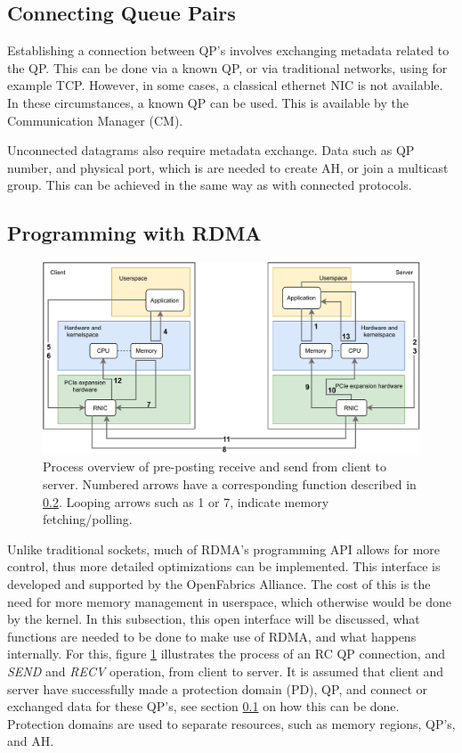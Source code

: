 \subsection{Connecting Queue Pairs}\label{subsec:connecting-qp's}
Establishing a connection between QP's involves exchanging metadata related to the QP.
This can be done via a known QP, or via traditional networks, using for example TCP.
However, in some cases, a classical ethernet NIC is not available.
In these circumstances, a known QP can be used.
This is available by the Communication Manager (CM)\cite{mellanox_prog_guide, rdmamojo}.

Unconnected datagrams also require metadata exchange.
Data such as QP number, and physical port, which is are needed to create AH, or join a multicast group.
This can be achieved in the same way as with connected protocols.

\subsection{Programming with RDMA}\label{subsec:programming-with-rdma}

\begin{figure}
    \centering
    \includegraphics[width=\columnwidth]{figures/PDF/RDMA_SEND_RECV_drawing}
    \caption[Process overview of \textit{SEND} and \textit{RECV}.]{Process overview of pre-posting receive and send from client to server. Numbered arrows have a corresponding function described in \ref{subsec:programming-with-rdma}. Looping arrows such as 1 or 7, indicate memory fetching/polling.}
    \label{fig:send_recv_drawing}
\end{figure}

Unlike traditional sockets, much of RDMA's programming API allows for more control, thus more detailed optimizations can be implemented.
This interface is developed and supported by the OpenFabrics Alliance\cite{openfab}.
The cost of this is the need for more memory management in userspace, which otherwise would be done by the kernel.
In this subsection, this open interface will be discussed, what functions are needed to be done to make use of RDMA, and what happens internally.
For this, figure \ref{fig:send_recv_drawing} illustrates the process of an RC QP connection, and \textit{SEND} and \textit{RECV} operation, from client to server.
It is assumed that client and server have successfully made a protection domain (PD), QP, and connect or exchanged data for these QP's, see section \ref{subsec:connecting-qp's} on how this can be done.
Protection domains are used to separate resources, such as memory regions, QP's, and AH.

